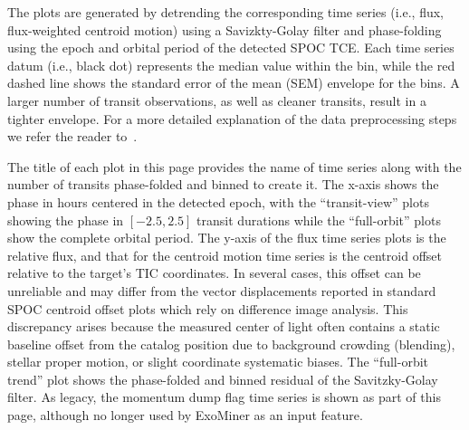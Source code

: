\documentclass{article}
\begin{document}
The plots are generated by detrending the corresponding time series (i.e., flux, flux-weighted centroid motion) using a Savizkty-Golay filter and phase-folding using the epoch and orbital period of the detected SPOC TCE. Each time series datum (i.e., black dot) represents the median value within the bin, while the red dashed line shows the standard error of the mean (SEM) envelope for the bins. A larger number of transit observations, as well as cleaner transits, result in a tighter envelope. For a more detailed explanation of the data preprocessing steps we refer the reader to~\citep{valizadegan2022exominer,valizadegan2025exominer++}. 

The title of each plot in this page provides the name of time series along with the number of transits phase-folded and binned to create it. The x-axis shows the phase in hours centered in the detected epoch, with the \enquote{transit-view} plots showing the phase in $[-2.5,2.5]$ transit durations while the \enquote{full-orbit} plots show the complete orbital period. The y-axis of the flux time series plots is the relative flux, and that for the centroid motion time series is the centroid offset relative to the target's TIC coordinates. In several cases, this offset can be unreliable and may differ from the vector displacements reported in standard SPOC centroid offset plots which rely on difference image analysis. This discrepancy arises because the measured center of light often contains a static baseline offset from the catalog position due to background crowding (blending), stellar proper motion, or slight coordinate systematic biases. The \enquote{full-orbit trend} plot shows the phase-folded and binned residual of the Savitzky-Golay filter. As legacy, the momentum dump flag time series is shown as part of this page, although no longer used by ExoMiner as an input feature.


\end{document}
